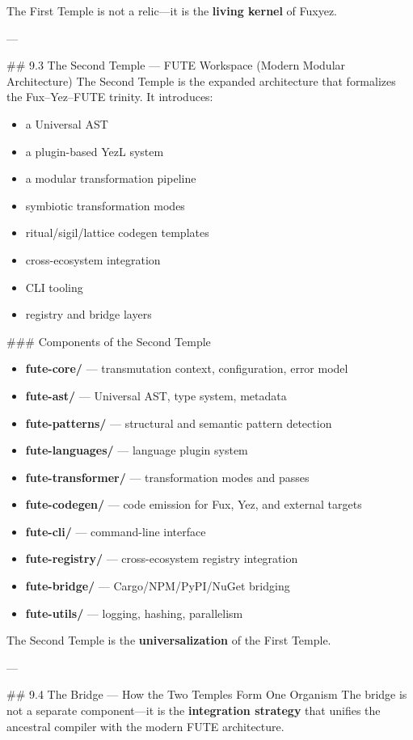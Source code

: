 \documentclass[12pt, a4paper]{book}
\begin{document}
The First Temple is not a relic—it is the \textbf{living kernel} of Fuxyez.

---

\#\# 9.3 The Second Temple — FUTE Workspace (Modern Modular Architecture)  
The Second Temple is the expanded architecture that formalizes the Fux–Yez–FUTE trinity. It introduces:

\begin{itemize}
  \item a Universal AST  
  \item a plugin-based YezL system  
  \item a modular transformation pipeline  
  \item symbiotic transformation modes  
  \item ritual/sigil/lattice codegen templates  
  \item cross-ecosystem integration  
  \item CLI tooling  
  \item registry and bridge layers  
\end{itemize}

\#\#\# Components of the Second Temple  
\begin{itemize}
  \item \textbf{fute-core/} — transmutation context, configuration, error model  
  \item \textbf{fute-ast/} — Universal AST, type system, metadata  
  \item \textbf{fute-patterns/} — structural and semantic pattern detection  
  \item \textbf{fute-languages/} — language plugin system  
  \item \textbf{fute-transformer/} — transformation modes and passes  
  \item \textbf{fute-codegen/} — code emission for Fux, Yez, and external targets  
  \item \textbf{fute-cli/} — command-line interface  
  \item \textbf{fute-registry/} — cross-ecosystem registry integration  
  \item \textbf{fute-bridge/} — Cargo/NPM/PyPI/NuGet bridging  
  \item \textbf{fute-utils/} — logging, hashing, parallelism  
\end{itemize}

The Second Temple is the \textbf{universalization} of the First Temple.

---

\#\# 9.4 The Bridge — How the Two Temples Form One Organism  
The bridge is not a separate component—it is the \textbf{integration strategy} that unifies the ancestral compiler with the modern FUTE architecture.
\end{document}
